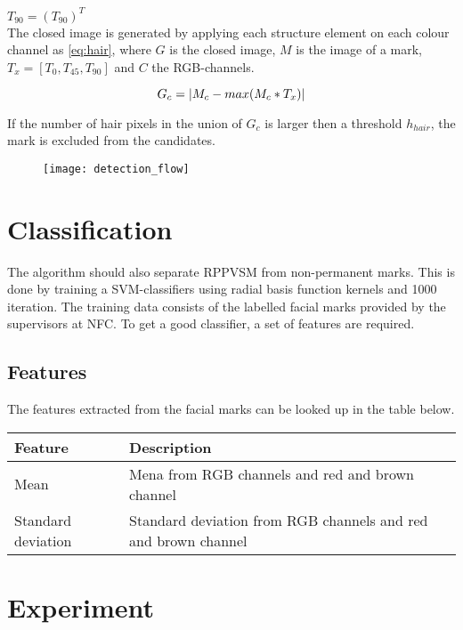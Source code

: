 $T_{90} = (T_{90})^{T} $ \\


The closed image is generated by applying each structure element on each colour channel as \ref{eq:hair}, where $G$ is the closed image, $M$ is the image of a mark, $T_x = [T_{0}, T_{45}, T_{90} ]$ and $C$ the RGB-channels.

\begin{equation} \label{eq:hair}
G_c = \lvert M_c - max(M_c * T_x)\rvert
\end{equation}

If the number of hair pixels in the union of $G_c$ is larger then a threshold $h_{hair}$, the mark is excluded from the candidates.  


\begin{figure}[tbp]
  \centering
  \texttt{[image: detection\_flow]}
  \caption{\label{fig:detection_flow}%
  }
\end{figure}

\section{Classification}

The algorithm should also separate RPPVSM from non-permanent marks. This is done by training a SVM-classifiers using radial basis function kernels and 1000 iteration. The training data consists of the labelled facial marks provided by the supervisors at NFC. To get a good classifier, a set of features are required. 

\subsection{Features}
The features extracted from the facial marks can be looked up in the table below. 

\begin{center}
	\begin{tabular}{|l|p{9cm}|}
	\hline
	Feature & Description	\\ \hline
	Mean & Mena from RGB channels and red and brown channel \\ \hline
	Standard deviation & Standard deviation from RGB channels and red and brown channel	\\ \hline
	\end{tabular}
\end{center}


\section{Experiment}
